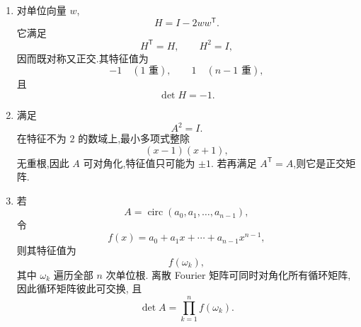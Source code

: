 \begin{solution}
\begin{enumerate}
    \item {}
    对单位向量 $w$,
    \[
    H=I-2ww^{\mathsf T}.
    \]
    它满足
    \[
    H^{\mathsf T}=H,\qquad H^2=I,
    \]
    因而既对称又正交.其特征值为
    \[
    -1\quad(1\text{ 重}),\qquad
    1\quad(n-1\text{ 重}),
    \]
    且
    \[
    \det H=-1.
    \]

    \item {}
    满足
    \[
    A^2=I.
    \]
    在特征不为 $2$ 的数域上,最小多项式整除
    \[
    (x-1)(x+1),
    \]
    无重根,因此 $A$ 可对角化,特征值只可能为 $\pm1$.
    若再满足 $A^{\mathsf T}=A$,则它是正交矩阵.

    \item {}
    若
    \[
    A=
    \operatorname{circ}(a_0,a_1,\ldots,a_{n-1}),
    \]
    令
    \[
    f(x)=a_0+a_1x+\cdots+a_{n-1}x^{n-1},
    \]
    则其特征值为
    \[
    f(\omega_k),
    \]
    其中 $\omega_k$ 遍历全部 $n$ 次单位根.
    离散 Fourier 矩阵可同时对角化所有循环矩阵,因此循环矩阵彼此可交换,
    且
    \[
    \det A=\prod\limits_{k=1}^{n}f(\omega_k).
    \]
\end{enumerate}
\end{solution}
